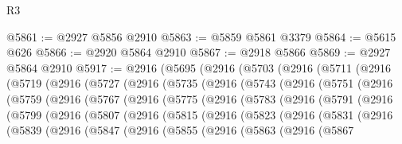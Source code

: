 \begin{lexlean}{R3}
\begin{coremodule}
@5861 := @2927 @5856 @2910
@5863 := @5859 @5861 @3379
@5864 := @5615 @626
@5866 := @2920 @5864 @2910
@5867 := @2918 @5866
@5869 := @2927 @5864 @2910
@5917 := @2916
    (@5695
      (@2916
        (@5703
          (@2916
            (@5711
              (@2916
                (@5719
                  (@2916
                    (@5727
                      (@2916
                        (@5735
                          (@2916
                            (@5743
                              (@2916
                                (@5751
                                  (@2916
                                    (@5759
                                      (@2916
                                        (@5767
                                          (@2916
                                            (@5775
                                              (@2916
                                                (@5783
                                                  (@2916
                                                    (@5791
                                                      (@2916
                                                        (@5799
                                                          (@2916
                                                            (@5807
                                                              (@2916
                                                                (@5815
                                                                  (@2916
                                                                    (@5823
                                                                      (@2916
                                                                        (@5831
                                                                          (@2916
                                                                            (@5839
                                                                              (@2916
                                                                                (@5847
                                                                                  (@2916
                                                                                    (@5855
                                                                                      (@2916
                                                                                        (@5863
                                                                                          (@2916
                                                                                            (@5867

\end{coremodule}
\end{lexlean}
